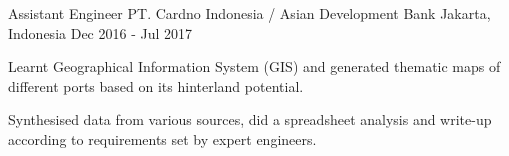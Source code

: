 

\begin{cventries}

  \cventry
    {Assistant Engineer} %
    {PT. Cardno Indonesia / Asian Development Bank} %
    {Jakarta, Indonesia} %
    {Dec 2016 - Jul 2017} %
    {
      \begin{cvitems} %
        \item {Learnt Geographical Information System (GIS) and generated thematic maps of different ports based on its hinterland potential.}
        \item {Synthesised data from various sources, did a spreadsheet analysis and write-up according to requirements set by expert engineers.}
      \end{cvitems}
    }


\end{cventries}
